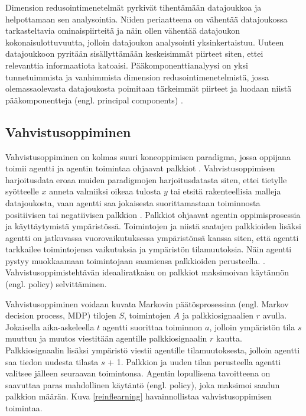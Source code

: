 \documentclass[utf8]{gradu3}
\begin{document}
Dimension redusointimenetelmät pyrkivät tihentämään datajoukkoa ja helpottamaan sen analysointia. Niiden periaatteena on vähentää datajoukossa tarkasteltavia ominaispiirteitä ja näin ollen vähentää datajoukon kokonaisulottuvuutta, jolloin datajoukon analysointi yksinkertaistuu. Uuteen datajoukkoon pyritään sisällyttämään keskeisimmät piirteet siten, ettei relevanttia informaatiota katoaisi. Pääkomponenttianalyysi on yksi tunnetuimmista ja vanhimmista dimension redusointimenetelmistä, jossa olemassaolevasta datajoukosta poimitaan tärkeimmät piirteet ja luodaan niistä pääkomponentteja (engl. principal components) \parencite{abdi2010principal}.

\subsection{Vahvistusoppiminen}

Vahvistusoppiminen on kolmas suuri koneoppimisen paradigma, jossa oppijana toimii agentti ja agentin toimintaa ohjaavat palkkiot \parencite{jordan2015machine}. Vahvistusoppimisen harjoitusdata eroaa muiden paradigmojen harjoitusdatasta siten, ettei tietylle syötteelle \(x\) anneta valmiiksi oikeaa tulosta \(y\) tai etsitä rakenteellisia malleja datajoukosta, vaan agentti saa jokaisesta suorittamastaan toiminnosta positiivisen tai negatiivisen palkkion \parencite{jordan2015machine}. Palkkiot ohjaavat agentin oppimisprosessia ja käyttäytymistä ympäristössä. Toimintojen ja niistä saatujen palkkioiden lisäksi agentti on jatkuvassa vuorovaikutuksessa ympäristönsä kanssa siten, että agentti tarkkailee toimintojensa vaikutuksia ja ympäristön tilamuutoksia. Näin agentti pystyy muokkaamaan toimintojaan saamiensa palkkioiden perusteella. \parencite{arulkumaran2017brief}. Vahvistusoppimistehtävän ideaaliratkaisu on palkkiot maksimoivan käytännön (engl. policy) selvittäminen.

Vahvistusoppiminen voidaan kuvata Markovin päätösprosessina (engl. Markov decision process, MDP) tilojen \(S\), toimintojen \(A\) ja palkkiosignaalien \(r\) avulla. Jokaisella aika-askeleella \(t\) agentti suorittaa toiminnon \(a\), jolloin ympäristön tila \(s\) muuttuu ja muutos viestitään agentille palkkiosignaalin \(r\) kautta. Palkkiosignaalin lisäksi ympäristö viestii agentille tilamuutoksesta, jolloin agentti saa tiedon uudesta tilasta \(s\) + 1. Palkkion ja uuden tilan perusteella agentti valitsee jälleen seuraavan toimintonsa. Agentin lopullisena tavoitteena on saavuttaa paras mahdollinen käytäntö (engl. policy), joka maksimoi saadun palkkion määrän. Kuva \ref{reinflearning} havainnollistaa vahvistusoppimisen toimintaa.
\end{document}
